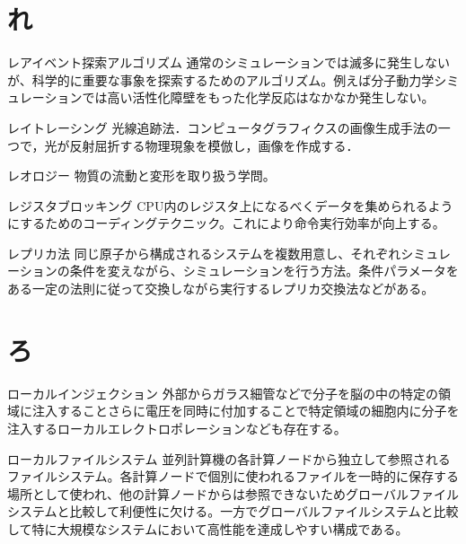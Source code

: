 \begin{用語集}
\section{れ}
\item{レアイベント探索アルゴリズム}{}
{通常のシミュレーションでは滅多に発生しないが、科学的に重要な事象を探索するためのアルゴリズム。例えば分子動力学シミュレーションでは高い活性化障壁をもった化学反応はなかなか発生しない。}
\item{レイトレーシング}{}
{光線追跡法．コンピュータグラフィクスの画像生成手法の一つで，光が反射屈折する物理現象を模倣し，画像を作成する．}
\item{レオロジー}{}
{物質の流動と変形を取り扱う学問。}
\item{レジスタブロッキング}{}
{CPU内のレジスタ上になるべくデータを集められるようにするためのコーディングテクニック。これにより命令実行効率が向上する。}
\item{レプリカ法}{}
{同じ原子から構成されるシステムを複数用意し、それぞれシミュレーションの条件を変えながら、シミュレーションを行う方法。条件パラメータをある一定の法則に従って交換しながら実行するレプリカ交換法などがある。}
\section{ろ}
\item{ローカルインジェクション}{}
{外部からガラス細管などで分子を脳の中の特定の領域に注入することさらに電圧を同時に付加することで特定領域の細胞内に分子を注入するローカルエレクトロポレーションなども存在する。}
\item{ローカルファイルシステム}{}
{並列計算機の各計算ノードから独立して参照されるファイルシステム。各計算ノードで個別に使われるファイルを一時的に保存する場所として使われ、他の計算ノードからは参照できないためグローバルファイルシステムと比較して利便性に欠ける。一方でグローバルファイルシステムと比較して特に大規模なシステムにおいて高性能を達成しやすい構成である。}
\end{用語集}
